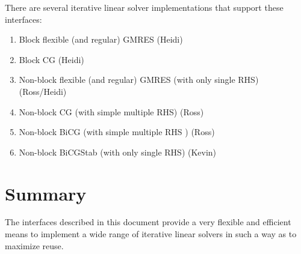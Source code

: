 \documentclass[pdf,ps2pdf,11pt]{SANDreport}
\begin{document}
There are several iterative linear solver implementations that support
these interfaces:

\begin{enumerate}
\item Block flexible (and regular) GMRES (Heidi)
\item Block CG (Heidi)
\item Non-block flexible (and regular) GMRES (with only single RHS) (Ross/Heidi)
\item Non-block CG (with simple multiple RHS) (Ross)
\item Non-block BiCG (with simple multiple RHS ) (Ross)
\item Non-block BiCGStab (with only single RHS) (Kevin)
\end{enumerate}

\section{Summary}

The interfaces described in this document provide a very flexible and
efficient means to implement a wide range of iterative linear solvers
in such a way as to maximize reuse.

%
\clearpage



%
%
\end{document}
